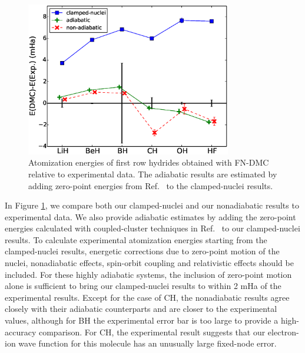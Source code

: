 \begin{figure}[h]
\centering
\includegraphics[width=0.8\textwidth]{atomization}
\caption{Atomization energies of first row hydrides obtained with FN-DMC relative to experimental data. The adiabatic results are estimated by adding zero-point energies from Ref.~\cite{Feller_Corrections} to the clamped-nuclei results. \label{fig:atomization}}
\end{figure}

In Figure \ref{fig:atomization}, we compare both our clamped-nuclei and our nonadiabatic results to experimental data. We also provide adiabatic estimates by adding the zero-point energies calculated with coupled-cluster techniques in Ref.~\cite{Feller_Corrections} to our clamped-nuclei results. To calculate experimental atomization energies starting from the clamped-nuclei results, energetic corrections due to zero-point motion of the nuclei, nonadiabatic effects, spin-orbit coupling and relativistic effects should be included. For these highly adiabatic systems, the inclusion of zero-point motion alone is sufficient to bring our clamped-nuclei results to within 2 mHa of the experimental results. Except for the case of CH, the nonadiabatic results agree closely with their adiabatic counterparts and are closer to the experimental values, although for BH the experimental error bar is too large to provide a high-accuracy comparison. For CH, the experimental result suggests that our electron-ion wave function for this molecule has an unusually large fixed-node error.


